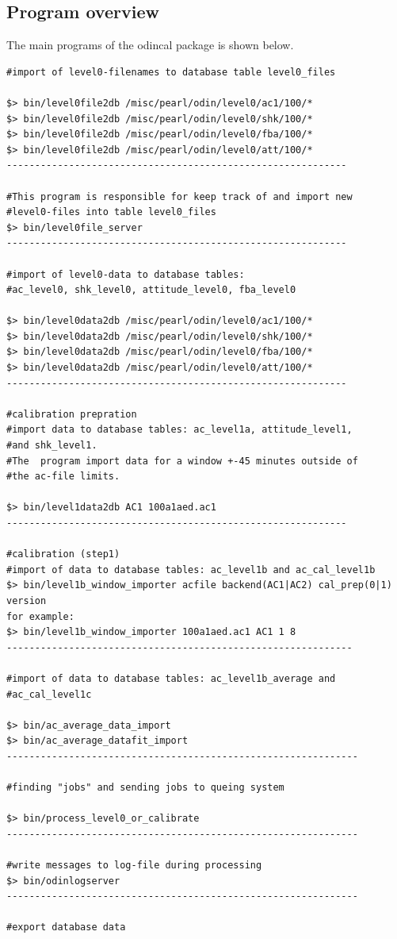 \documentclass[12pt]{article}
\begin{document}
\subsection{Program overview}
\label{sec:programs}
The main programs of the odincal package is shown below.
\begin{verbatim}
#import of level0-filenames to database table level0_files

$> bin/level0file2db /misc/pearl/odin/level0/ac1/100/*
$> bin/level0file2db /misc/pearl/odin/level0/shk/100/*
$> bin/level0file2db /misc/pearl/odin/level0/fba/100/*
$> bin/level0file2db /misc/pearl/odin/level0/att/100/*
------------------------------------------------------------

#This program is responsible for keep track of and import new 
#level0-files into table level0_files
$> bin/level0file_server   
------------------------------------------------------------  

#import of level0-data to database tables:
#ac_level0, shk_level0, attitude_level0, fba_level0

$> bin/level0data2db /misc/pearl/odin/level0/ac1/100/*
$> bin/level0data2db /misc/pearl/odin/level0/shk/100/*
$> bin/level0data2db /misc/pearl/odin/level0/fba/100/*
$> bin/level0data2db /misc/pearl/odin/level0/att/100/*
------------------------------------------------------------

#calibration prepration
#import data to database tables: ac_level1a, attitude_level1, 
#and shk_level1.
#The  program import data for a window +-45 minutes outside of 
#the ac-file limits.

$> bin/level1data2db AC1 100a1aed.ac1
------------------------------------------------------------

#calibration (step1)
#import of data to database tables: ac_level1b and ac_cal_level1b
$> bin/level1b_window_importer acfile backend(AC1|AC2) cal_prep(0|1) version
for example:
$> bin/level1b_window_importer 100a1aed.ac1 AC1 1 8
-------------------------------------------------------------

#import of data to database tables: ac_level1b_average and 
#ac_cal_level1c

$> bin/ac_average_data_import
$> bin/ac_average_datafit_import
--------------------------------------------------------------

#finding "jobs" and sending jobs to queing system

$> bin/process_level0_or_calibrate
--------------------------------------------------------------

#write messages to log-file during processing
$> bin/odinlogserver
--------------------------------------------------------------

#export database data

\end{verbatim}
\end{document}
